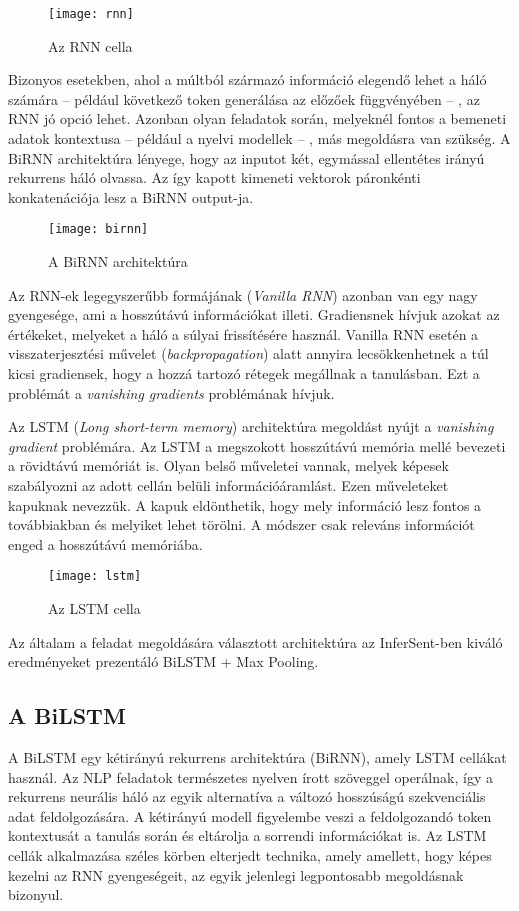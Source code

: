 \begin{figure}[H]
	\centering
	\texttt{[image: rnn]}
	\caption{Az RNN cella \cite{rnn}}
\end{figure}

Bizonyos esetekben, ahol a múltból származó információ elegendő lehet a háló számára – például következő token generálása az előzőek függvényében – , az RNN jó opció lehet. Azonban olyan feladatok során, melyeknél fontos a bemeneti adatok kontextusa – például a nyelvi modellek – , más megoldásra van szükség. A BiRNN architektúra lényege, hogy az inputot két, egymással ellentétes irányú rekurrens háló olvassa. Az így kapott kimeneti vektorok páronkénti konkatenációja lesz a BiRNN output-ja.

\begin{figure}[H]
	\centering
	\texttt{[image: birnn]}
	\caption{A BiRNN architektúra \cite{birnn}}
\end{figure}

Az RNN-ek legegyszerűbb formájának (\textit{Vanilla RNN}) azonban van egy nagy gyengesége, ami a hosszútávú információkat illeti. Gradiensnek hívjuk azokat az értékeket, melyeket a háló a súlyai frissítésére használ. Vanilla RNN esetén a visszaterjesztési művelet (\textit{backpropagation}) alatt annyira lecsökkenhetnek a túl kicsi gradiensek, hogy a hozzá tartozó rétegek megállnak a tanulásban. Ezt a problémát a \textit{vanishing gradients} problémának hívjuk.

Az LSTM (\textit{Long short-term memory}) architektúra megoldást nyújt a \textit{vanishing gradient} problémára. Az LSTM a megszokott hosszútávú memória mellé bevezeti a rövidtávú memóriát is. Olyan belső műveletei vannak, melyek képesek szabályozni az adott cellán belüli információáramlást. Ezen műveleteket kapuknak nevezzük. A kapuk eldönthetik, hogy mely információ lesz fontos a továbbiakban és melyiket lehet törölni. A módszer csak releváns információt enged a hosszútávú memóriába.

\begin{figure}[H]
	\centering
	\texttt{[image: lstm]}
	\caption{Az LSTM cella \cite{rnn}}
\end{figure}

Az általam a feladat megoldására választott architektúra az InferSent-ben kiváló eredményeket prezentáló BiLSTM + Max Pooling.

\subsection{A BiLSTM}
A BiLSTM egy kétirányú rekurrens architektúra (BiRNN), amely LSTM cellákat használ. Az NLP feladatok természetes nyelven írott szöveggel operálnak, így a rekurrens neurális háló az egyik alternatíva a változó hosszúságú szekvenciális adat feldolgozására. A kétirányú modell figyelembe veszi a feldolgozandó token kontextusát a tanulás során és eltárolja a sorrendi információkat is. Az LSTM cellák alkalmazása széles körben elterjedt technika, amely amellett, hogy képes kezelni az RNN gyengeségeit, az egyik jelenlegi legpontosabb megoldásnak bizonyul.

